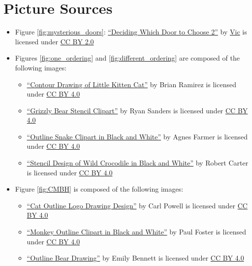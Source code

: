 \documentclass[hidelinks]{scrartcl}
\begin{document}
\section*{Picture Sources}
\begin{itemize}
\item Figure \ref{fig:mysterious_doors}: \href{https://flic.kr/p/aQUzkH}{``Deciding Which Door to Choose 2''} by \href{https://www.flickr.com/photos/59632563@N04/}{Vic} is licensed under \href{https://creativecommons.org/licenses/by/2.0/}{CC BY 2.0}
\item Figures \ref{fig:one_ordering} and \ref{fig:different_ordering} are composed of the following images:
	\begin{itemize}
	\item \href{http://animalsclipart.com/contour-drawing-of-little-kitten-cat/}{``Contour Drawing of Little Kitten Cat''} by Brian Ramirez is licensed under \href{https://creativecommons.org/licenses/by/4.0/}{CC BY 4.0}
	\item \href{http://animalsclipart.com/grizzly-bear-stencil-clipart/}{``Grizzly Bear Stencil Clipart''} by Ryan Sanders is licensed under \href{https://creativecommons.org/licenses/by/4.0/}{CC BY 4.0}
	\item \href{http://animalsclipart.com/outline-snake-clipart-in-black-and-white/}{``Outline Snake Clipart in Black and White''} by Agnes Farmer is licensed under \href{https://creativecommons.org/licenses/by/4.0/}{CC BY 4.0}
	\item \href{http://animalsclipart.com/stencil-design-of-wild-crocodile-in-black-and-white/}{``Stencil Design of Wild Crocodile in Black and White''} by Robert Carter is licensed under \href{https://creativecommons.org/licenses/by/4.0/}{CC BY 4.0}
	\end{itemize}
\item Figure \ref{fig:CMBH} is composed of the following images:
	\begin{itemize}
	\item \href{http://animalsclipart.com/cat-outline-logo-drawing-design/}{``Cat Outline Logo Drawing Design''} by Carl Powell is licensed under \href{https://creativecommons.org/licenses/by/4.0/}{CC BY 4.0}
	\item \href{http://animalsclipart.com/monkey-outline-clipart-in-black-and-white/}{``Monkey Outline Clipart in Black and White''} by Paul Foster is licensed under \href{https://creativecommons.org/licenses/by/4.0/}{CC BY 4.0}
	\item \href{http://animalsclipart.com/outline-bear-drawing/}{``Outline Bear Drawing''} by Emily Bennett is licensed under \href{https://creativecommons.org/licenses/by/4.0/}{CC BY 4.0}

\end{itemize}
\end{itemize}
\end{document}
